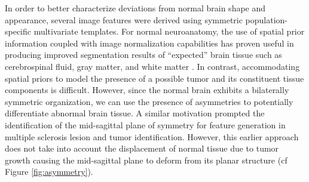 \documentclass[preprint,authoryear,review,12pt]{elsarticle}
\begin{document}
In order to better characterize deviations from normal brain shape 
and appearance, several image features were derived using symmetric 
population-specific multivariate templates.  
For normal neuroanatomy, the use of spatial prior information 
coupled with image normalization capabilities has proven useful 
in producing improved segmentation results of ``expected'' brain tissue
such as cerebrospinal fluid, gray matter, and white matter 
\citep[e.g.,][]{ashburner1997}.  In contrast, accommodating spatial 
priors to model the presence of a possible tumor and its constituent tissue 
components is difficult. However, since the normal brain 
exhibits a bilaterally symmetric organization, we can 
use the presence of asymmetries to potentially differentiate abnormal 
brain tissue.  A similar motivation prompted
the identification of the mid-sagittal plane of symmetry \citep{prima2002}
for feature generation in multiple sclerosis lesion \citep{geremia2011} and 
tumor \citep{geremia2012} identification.  However, this earlier
approach does not take into account the displacement of 
normal tissue due to tumor growth causing the mid-sagittal plane
to deform from its planar structure (cf Figure \ref{fig:asymmetry}).
\end{document}
